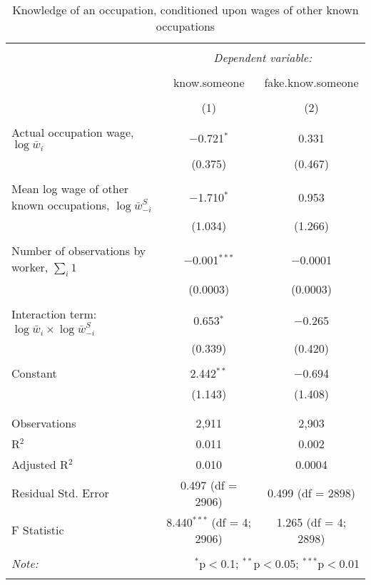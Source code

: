 
\begin{table}[!htbp] \centering 
  \caption{Knowledge of an occupation, conditioned upon wages of other known occupations} 
  \label{tab:clustering} 
\begin{tabular}{@{\extracolsep{5pt}}lcc} 
\\[-1.8ex]\hline 
\hline \\[-1.8ex] 
 & \multicolumn{2}{c}{\textit{Dependent variable:}} \\ 
\cline{2-3} 
\\[-1.8ex] & know.someone & fake.know.someone \\ 
\\[-1.8ex] & (1) & (2)\\ 
\hline \\[-1.8ex] 
 Actual occupation wage, $\log \bar{w}_i$ & $-$0.721$^{*}$ & 0.331 \\ 
  & (0.375) & (0.467) \\ 
  & & \\ 
 Mean log wage of other known occupations, $\log \bar{w}^S_{-i}$ & $-$1.710$^{*}$ & 0.953 \\ 
  & (1.034) & (1.266) \\ 
  & & \\ 
 Number of observations by worker, $\sum_i 1$ & $-$0.001$^{***}$ & $-$0.0001 \\ 
  & (0.0003) & (0.0003) \\ 
  & & \\ 
 Interaction term: $\log \bar{w}_i \times \log \bar{w}^S_{-i}$ & 0.653$^{*}$ & $-$0.265 \\ 
  & (0.339) & (0.420) \\ 
  & & \\ 
 Constant & 2.442$^{**}$ & $-$0.694 \\ 
  & (1.143) & (1.408) \\ 
  & & \\ 
\hline \\[-1.8ex] 
Observations & 2,911 & 2,903 \\ 
R$^{2}$ & 0.011 & 0.002 \\ 
Adjusted R$^{2}$ & 0.010 & 0.0004 \\ 
Residual Std. Error & 0.497 (df = 2906) & 0.499 (df = 2898) \\ 
F Statistic & 8.440$^{***}$ (df = 4; 2906) & 1.265 (df = 4; 2898) \\ 
\hline 
\hline \\[-1.8ex] 
\textit{Note:}  & \multicolumn{2}{r}{$^{*}$p$<$0.1; $^{**}$p$<$0.05; $^{***}$p$<$0.01} \\ 
\normalsize 
\end{tabular} 
\end{table} 
